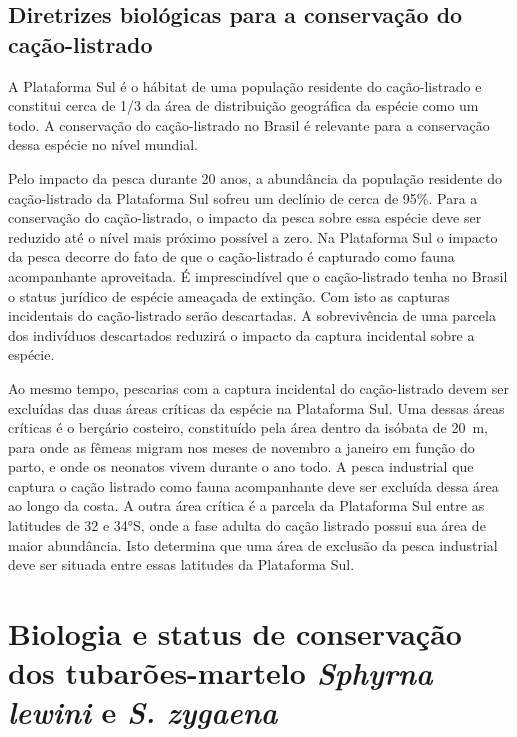 \documentclass[a4paper,11pt,twoside,showtrims,onecolumn,openright,final]{memoir}
\begin{document}
\section*{Diretrizes biológicas para a conservação do cação-listrado}

A Plataforma Sul é o hábitat de uma população residente do cação-listrado e constitui 
cerca de 1/3 da área de distribuição geográfica da espécie como um todo. 
A conservação do cação-listrado no Brasil é relevante para a conservação dessa espécie no nível mundial. 

Pelo impacto da pesca durante 20 anos, a abundância da população residente do cação-listrado 
da Plataforma Sul sofreu um declínio de cerca de 95\%. Para a conservação do cação-listrado, 
o impacto da pesca sobre essa espécie deve ser reduzido até o nível mais próximo possível a zero. 
Na Plataforma Sul o impacto da pesca decorre do fato de que o cação-listrado é capturado como fauna 
acompanhante aproveitada. É imprescindível que o cação-listrado tenha no Brasil o status jurídico 
de espécie ameaçada de extinção. Com  isto as capturas incidentais do cação-listrado serão descartadas.
A sobrevivência de uma parcela dos indivíduos descartados  reduzirá o impacto da captura incidental 
sobre a espécie.

Ao mesmo tempo, pescarias com a captura incidental do cação-listrado devem ser excluídas das 
duas áreas críticas da espécie na Plataforma Sul. Uma dessas áreas críticas  é o berçário costeiro, 
constituído pela área dentro da isóbata de 20~m, para onde as fêmeas migram nos meses de novembro a 
janeiro em função do parto, e onde os neonatos vivem durante o ano todo. A pesca industrial que 
captura o cação listrado como fauna acompanhante deve ser excluída dessa área ao longo da costa. 
A outra área crítica é a parcela da Plataforma Sul entre as latitudes de 32 e 34°S, onde a fase 
adulta do cação listrado possui sua área de maior abundância. Isto determina que uma área de 
exclusão da pesca industrial deve ser situada entre essas latitudes da Plataforma Sul. 



\chapter[Biologia e status de conservação dos tubarões-martelo \newline
         \emph{Sphyrna lewini} e \emph{S. zygaena}]
        {Biologia e status de conservação dos tubarões-martelo 
         \emph{Sphyrna lewini} e \emph{S. zygaena}}\label{chap:martelos}
\end{document}
